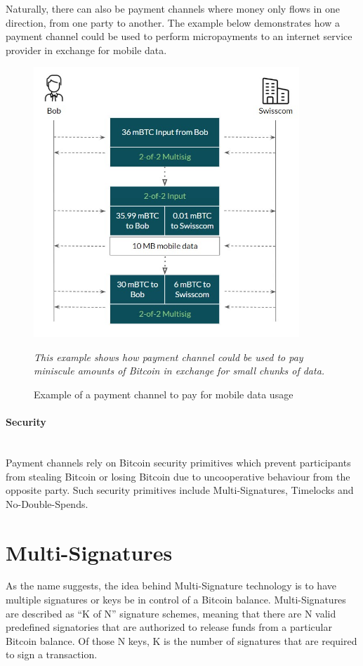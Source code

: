 \documentclass[a4paper, 12pt]{report}
\begin{document}
\par Naturally, there can also be payment channels where money only flows in one direction, from one party to another. The example below demonstrates how a payment channel could be used to perform micropayments to an internet service provider in exchange for mobile data.

\begin{figure}[H]
	\centering
	\includegraphics[width=10cm]{07_Onedirectional_Channel}
	\caption{Example of a payment channel to pay for mobile data usage}
	\medskip
	\small \textit{This example shows how payment channel could be used to pay miniscule amounts of Bitcoin in exchange for small chunks of data.}
	\label{fig:07_Onedirectional_Channel}
\end{figure}

\paragraph{Security} \hspace{0pt} \\
Payment channels rely on Bitcoin security primitives which prevent participants from stealing Bitcoin or losing Bitcoin due to uncooperative behaviour from the opposite party. Such security primitives include Multi-Signatures, Timelocks and No-Double-Spends.

\section{Multi-Signatures}

\par As the name suggests, the idea behind Multi-Signature technology is to have multiple signatures or keys be in control of a Bitcoin balance. Multi-Signatures are described as “K of N” signature schemes, meaning that there are N valid predefined signatories that are authorized to release funds from a particular Bitcoin balance. Of those N keys, K is the number of signatures that are required to sign a transaction.\cite{inbook}
\end{document}
